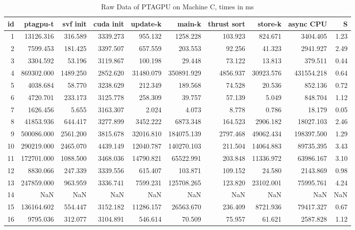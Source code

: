 \begin{table}[ht]
    \tiny
    \begin{tabular}{rrrrrrrrrr}
        \toprule
        id & ptagpu-t   & svf init & cuda init & update-k  & main-k     & thrust sort & store-k   & async CPU  & S    \\
        \midrule
        1  & 13126.316  & 316.589  & 3339.273  & 955.132   & 1258.228   & 103.923     & 824.671   & 3404.405   & 1.23 \\
        2  & 7599.453   & 181.425  & 3397.507  & 657.559   & 203.553    & 92.256      & 41.323    & 2941.927   & 2.49 \\
        3  & 3304.592   & 53.196   & 3119.867  & 100.198   & 29.448     & 73.122      & 13.813    & 379.511    & 0.44 \\
        4  & 869302.000 & 1489.250 & 2852.620  & 31480.079 & 350891.929 & 4856.937    & 30923.576 & 431554.218 & 0.64 \\
        5  & 4038.684   & 58.770   & 3238.629  & 212.349   & 189.568    & 74.528      & 20.536    & 852.136    & 0.72 \\
        6  & 4720.701   & 233.173  & 3125.778  & 258.309   & 39.757     & 57.139      & 5.049     & 848.704    & 1.12 \\
        7  & 1626.456   & 5.655    & 3163.307  & 2.024     & 4.073      & 8.778       & 0.786     & 18.179     & 0.05 \\
        8  & 41853.936  & 644.417  & 3277.899  & 3452.222  & 6873.348   & 164.523     & 2906.182  & 18027.103  & 2.46 \\
        9  & 500086.000 & 2561.200 & 3815.678  & 32016.810 & 184075.139 & 2797.468    & 49062.434 & 198397.500 & 1.29 \\
        10 & 290219.000 & 2465.070 & 4439.149  & 12040.787 & 140270.103 & 211.504     & 14064.883 & 89735.395  & 3.43 \\
        11 & 172701.000 & 1088.500 & 3468.036  & 14790.821 & 65522.991  & 203.848     & 11336.972 & 63986.167  & 3.10 \\
        12 & 8830.066   & 247.339  & 3339.556  & 615.407   & 103.871    & 109.152     & 24.580    & 2143.869   & 0.98 \\
        13 & 247859.000 & 963.959  & 3336.741  & 7599.231  & 125708.265 & 123.820     & 23102.001 & 75995.761  & 4.24 \\
        14 & NaN        & NaN      & NaN       & NaN       & NaN        & NaN         & NaN       & NaN        & NaN  \\
        15 & 136164.602 & 554.447  & 3152.182  & 11286.157 & 26563.670  & 236.409     & 8721.936  & 79417.327  & 0.67 \\
        16 & 9795.036   & 312.077  & 3104.891  & 546.614   & 70.509     & 75.957      & 61.621    & 2587.828   & 1.12 \\
        \bottomrule
    \end{tabular}
    \caption{Raw Data of PTAGPU on Machine C, times in ms}
\end{table}
\normalsize

